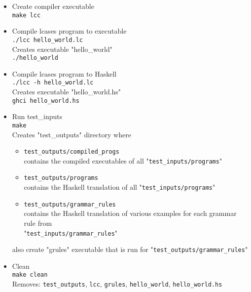 \documentclass[diploma]{softlab-thesis}
\begin{document}
\begin{itemize}
\item Create compiler executable \\

\texttt{make lcc} \\

\item Compile lcases program to executable \\

\texttt{./lcc hello_world.lc} \\

Creates executable "hello_world" \\

\texttt{./hello_world}

\item Compile lcases program to Haskell \\

\texttt{./lcc -h hello_world.lc} \\

Creates executable "hello_world.hs" \\

\texttt{ghci hello_world.hs} \\

\item Run test_inputs \\

\texttt{make} \\

Creates "test_outputs" directory where
\begin{itemize}

\item
\verb|test_outputs/compiled_progs| \\
contains the compiled executables of all "\verb|test_inputs/programs|"

\item
\verb|test_outputs/programs| \\
contains the Haskell translation of all "\verb|test_inputs/programs|"

\item
\verb|test_outputs/grammar_rules| \\
contains the Haskell translation of various examples for each grammar rule from
\\
"\verb|test_inputs/grammar_rules|"

\end{itemize}

also create "grules" executable that is run for
"\verb|test_outputs/grammar_rules|" \\

\item Clean \\

\texttt{make clean} \\

Removes: \verb|test_outputs|, \verb|lcc|, \verb|grules|, \verb|hello_world|,
\verb|hello_world.hs|

\end{itemize}
\end{document}
